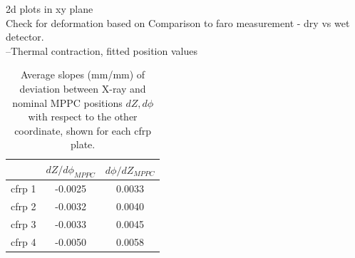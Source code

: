 \noindent 2d plots in xy plane \\
Check for deformation based on Comparison to faro measurement - dry vs wet detector.\\
--Thermal contraction, fitted position values\\

\begin{table}
\begin{tabular}{ccc}
   & $dZ/d\phi_{MPPC}$ & $d\phi/dZ_{MPPC}$ \\
\hline 
cfrp 1 & -0.0025 & 0.0033 \\
cfrp 2 & -0.0032 & 0.0040 \\
cfrp 3 & -0.0033 & 0.0045 \\
cfrp 4 & -0.0050 & 0.0058 \\
\end{tabular}
\caption{Average slopes (mm/mm) of deviation between X-ray and nominal MPPC positions
$dZ, d\phi$ with respect to the other coordinate, shown for each 
cfrp plate.
}
\label{tab:rotation}
\end{table}

